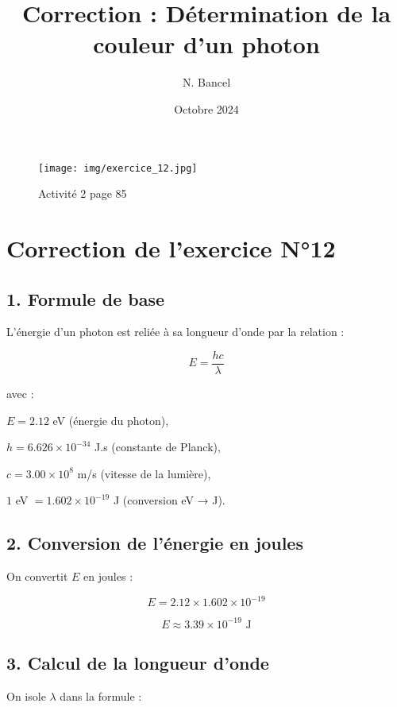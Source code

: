 \documentclass[a4paper,12pt]{article}
\begin{document}
\title{Correction : Détermination de la couleur d'un photon}
\author{N. Bancel}
\date{Octobre 2024}
\maketitle


\begin{figure}[H]
  \centering
  \texttt{[image: img/exercice\_12.jpg]}
  \captionsetup{labelformat=empty}
  \caption{\label{} Activité 2 page 85}
\end{figure}


\section*{Correction de l'exercice N°12}

\subsection*{1. Formule de base}
L'énergie d'un photon est reliée à sa longueur d'onde par la relation :

\begin{equation}
    E = \frac{h c}{\lambda}
\end{equation}

avec :
\begin{compactenum}
    \item $E = 2.12$ eV (énergie du photon),
    \item $h = 6.626 \times 10^{-34}$ J.s (constante de Planck),
    \item $c = 3.00 \times 10^8$ m/s (vitesse de la lumière),
    \item $1$ eV $= 1.602 \times 10^{-19}$ J (conversion eV → J).
\end{compactenum}

\subsection*{2. Conversion de l'énergie en joules}
On convertit $E$ en joules :

\begin{equation}
    E = 2.12 \times 1.602 \times 10^{-19}
\end{equation}

\begin{equation}
    E \approx 3.39 \times 10^{-19} \text{ J}
\end{equation}

\subsection*{3. Calcul de la longueur d'onde}
On isole $\lambda$ dans la formule :
\end{document}
